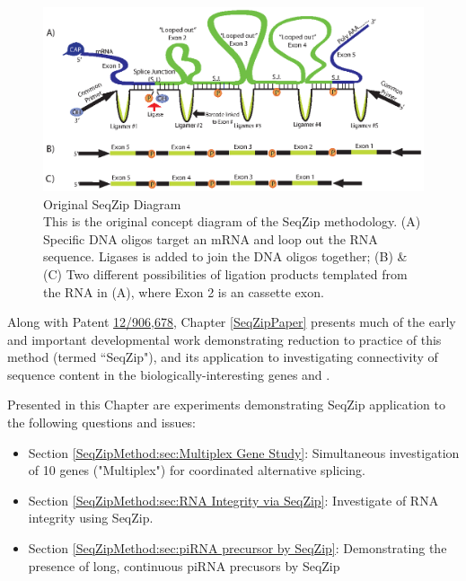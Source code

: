   \begin{figure} %
    \centering 
    \includegraphics{Figures/SeqZipMethod/OriginalSeqZipDiagram.eps}
    \caption[Original SeqZip Diagram]
    {
      Original SeqZip Diagram\\[0.25cm]
      This is the original concept diagram of the SeqZip methodology. (A) Specific DNA oligos target an mRNA and loop out the RNA sequence. Ligases is added to join the DNA oligos together; (B) \& (C) Two different possibilities of ligation products templated from the RNA in (A), where Exon 2 is an cassette exon.
    	}
    \label{SeqZipMethod:fig:Original SeqZip Diagram}
  	\end{figure}

  Along with Patent \href{http://1.usa.gov/PTG9BB}{12/906,678}, Chapter \ref{SeqZipPaper} presents much of the early and important developmental work demonstrating reduction to practice of this method (termed ``SeqZip"), and its application to investigating connectivity of sequence content in the biologically-interesting genes \fn{} and \dscam{}. 

  Presented in this Chapter are experiments demonstrating SeqZip application to the following questions and issues:

  \begin{itemize} %
    \singlespacing
    \item Section \ref{SeqZipMethod:sec:Multiplex Gene Study}: 
      Simultaneous investigation of 10 genes ("Multiplex") for coordinated alternative splicing.
    \item Section \ref{SeqZipMethod:sec:RNA Integrity via SeqZip}: 
      Investigate of RNA integrity using SeqZip.
    \item Section \ref{SeqZipMethod:sec:piRNA precursor by SeqZip}: 
      Demonstrating the presence of long, continuous piRNA precusors by SeqZip
	  \end{itemize}

